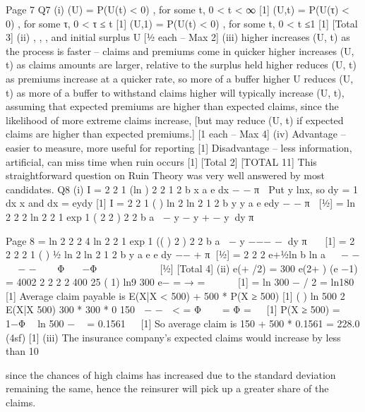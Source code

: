 \documentclass[a4paper,12pt]{article}
\begin{document}
Page 7
Q7 (i) \psi (U) = P(U(t) < 0) , for some t, 0 < t < ∞ [1]
\psi (U,t) = P(U(τ) < 0) , for some τ, 0 < τ ≤ t [1]
\psi (U,1) = P(U(t) < 0) , for some t, 0 < t ≤1 [1]
[Total 3]
(ii) \lambda , \mu , , \theta  and initial surplus U [½ each – Max 2]
(iii) higher \lambda  increases \psi (U, t) as the process is faster – claims and premiums come in quicker
higher \mu  increases \psi (U, t) as claims amounts are larger, relative to the surplus held
higher \theta  reduces \psi (U, t) as premiums increase at a quicker rate, so more of a buffer
higher U reduces \psi (U, t) as more of a buffer to withstand claims
higher  will typically increase \psi (U, t), assuming that expected premiums
are higher than expected claims, since the likelihood of more
extreme claims increase, [but may reduce \psi (U, t) if expected claims
                          are higher than expected premiums.]
[1 each – Max 4]
(iv) Advantage – easier to measure, more useful for reporting [1]
Disadvantage – less information, artificial, can miss time when ruin occurs [1]
[Total 2]
[TOTAL 11]
This straightforward question on Ruin Theory was very well answered by
most candidates.
Q8 (i) I =
  2
2
1 (ln )
2
2
1
2
b x
a
e dx
− −\mu 
\sigma 
π\sigma 

Put y lnx, so dy = 1 dx
x
and dx = eydy [1]
I =
  2
2
1 ( ) ln 2
ln 2
1
2
b y y
a
e edy
− −\mu 
\sigma 
π\sigma 
 [½]
=
  ln 2 2 2
ln 2 2
1 exp 1 ( 2 2 )
2 2
b
a
− y − \mu y + \mu  − y\sigma  dy
π\sigma   \sigma  

Page 8
=
  ln 2 2 2 4
ln 2 2
1 exp 1 (( ) 2 )
2 2
b
a
− y −\mu  −\sigma  − \mu \sigma  −\sigma  dy
π\sigma   \sigma  
 [1]
=
  2 2
2 2
1 ( ) ½ ln 2
ln 2
1
2
b y
a
e e dy
−\mu −\sigma 
\mu + \sigma  \sigma 
π\sigma   [½]
= 2 2 2
e\mu +½\sigma  ln b ln a   − \mu  − \sigma    − \mu  − \sigma    Φ  −Φ     \sigma    \sigma   
[½]
[Total 4]
(ii)
e(\mu + /2) = 300
e(2\mu + ) (e −1) = 4002
2 2
2
2
400 25 ( 1) ln9 300
e\sigma  − = → \sigma  =  
 
[1]
\mu  = ln 300 −  / 2 = ln180 [1]
Average claim payable is
E(X|X < 500) + 500 * P(X ≥ 500) [1]
( )
ln 500 2 E(X|X 500) 300 * 300 * 0 150
 − \mu  − \sigma   < = Φ   = Φ =  \sigma  
[1]
P(X ≥ 500) = 1−Φ  ln 500 − \mu   = 0.1561  \sigma  
[1]
So average claim is 150 + 500 * 0.1561 = 228.0 (4sf) [1]
(iii) The insurance company’s expected claims would increase by less than 10%

since the chances of high claims has increased due to the standard deviation remaining the same, hence the reinsurer will pick up a greater share of the claims.%

\end{document}
